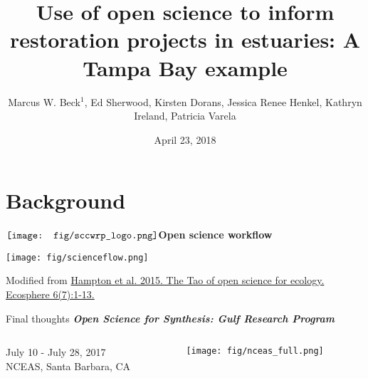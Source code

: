 \documentclass[serif]{beamer}\usepackage[]{graphicx}\usepackage[]{color}
\newcommand{\emtxt}[1]{\textbf{\textit{{\color{mypal4} #1}}}}
\begin{document}
\title[Open science for restoration]{\textbf{Use of open science to inform restoration projects in estuaries: A Tampa Bay example}}
\author[Beck et al.]{Marcus W. Beck$^1$, Ed Sherwood, Kirsten Dorans, Jessica Renee Henkel, Kathryn Ireland, Patricia Varela}


\date{April 23, 2018}


\begin{frame}[shrink]
\vspace{0.2in}
\titlepage
\end{frame}

\section{Background}

\begin{frame}{{$\vcenter{\hbox{\texttt{[image: fig/sccwrp\_logo.png]}}}$\hspace{0.07in}\textbf{Open science workflow}}}
\centerline{\texttt{[image: fig/scienceflow.png]}}
\vfill
\tiny
Modified from \href{https://esajournals.onlinelibrary.wiley.com/doi/full/10.1890/ES14-00402.1}{Hampton et al. 2015. The Tao of open science for ecology. Ecosphere 6(7):1-13.}
\end{frame}

\begin{frame}[t]{Final thoughts}{}
{\large \emtxt{Open Science for Synthesis: Gulf Research Program}}
\begin{columns}
\begin{column}{0.5\textwidth}
July 10 - July 28, 2017\\
NCEAS, Santa Barbara, CA 
\end{column}
\begin{column}{0.5\textwidth}
\hfill \texttt{[image: fig/nceas\_full.png]}
\end{column}
\end{columns}
\vspace{0.1in}
\begin{columns}
\begin{column}{0.5\textwidth}
\centerline{}
\end{column}
\begin{column}{0.5\textwidth}
\centerline{}
\end{column}
\end{columns}
\end{frame}
\end{document}
